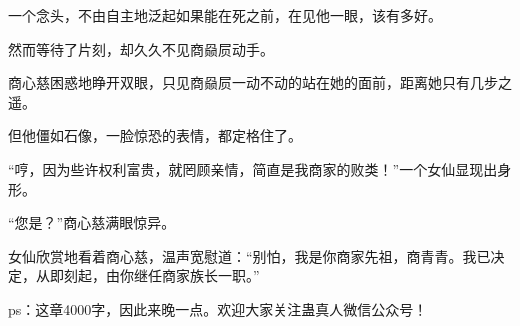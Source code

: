 \begin{this_body}
一个念头，不由自主地泛起如果能在死之前，在见他一眼，该有多好。

然而等待了片刻，却久久不见商赑屃动手。

商心慈困惑地睁开双眼，只见商赑屃一动不动的站在她的面前，距离她只有几步之遥。

但他僵如石像，一脸惊恐的表情，都定格住了。

“哼，因为些许权利富贵，就罔顾亲情，简直是我商家的败类！”一个女仙显现出身形。

“您是？”商心慈满眼惊异。

女仙欣赏地看着商心慈，温声宽慰道：“别怕，我是你商家先祖，商青青。我已决定，从即刻起，由你继任商家族长一职。”

ps：这章4000字，因此来晚一点。欢迎大家关注蛊真人微信公众号！

\end{this_body}

